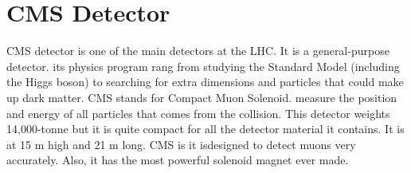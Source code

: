 
\section{CMS Detector}
CMS detector is one of the main detectors at the LHC. It is a general-purpose detector. its physics program rang from studying the Standard Model (including the Higgs boson) to searching for extra dimensions and particles that could make up dark matter.  
CMS stands for Compact Muon Solenoid. measure the position and energy of all particles that comes from the collision. This detector weights 14,000-tonne but it is quite compact for all the detector material it contains. It is at 15 m high and 21 m long.
CMS is it isdesigned to detect muons very accurately. Also, it has the most powerful solenoid magnet ever made.  

